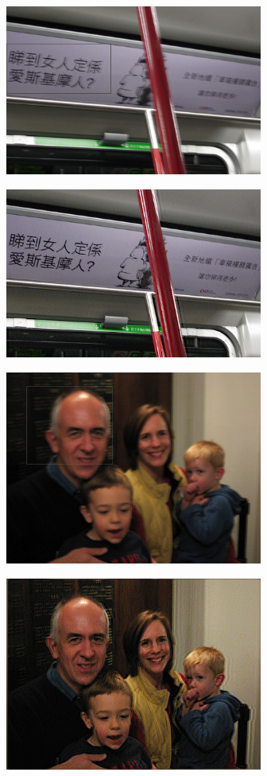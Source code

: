 \documentclass{beamer}
\begin{document}
\begin{frame}[plain]
    \begin{center}
        \includegraphics[width=240pt]{img/img-025.png}
    \end{center}
\end{frame}
\begin{frame}[plain]
    \begin{center}
        \includegraphics[width=240pt]{img/img-026.png}
    \end{center}
\end{frame}
\begin{frame}[plain]
    \begin{center}
        \includegraphics[width=240pt]{img/img-031.png}
    \end{center}
\end{frame}
\begin{frame}[plain]
    \begin{center}
        \includegraphics[width=240pt]{img/img-032.png}
    \end{center}
\end{frame}
\end{document}
